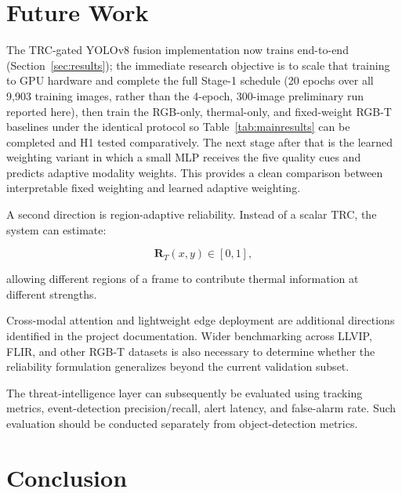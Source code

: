 \documentclass[conference]{IEEEtran}
\begin{document}

\section{Future Work}

The TRC-gated YOLOv8 fusion implementation now trains end-to-end
(Section~\ref{sec:results}); the immediate research objective is to
scale that training to GPU hardware and complete the full Stage-1
schedule (20 epochs over all 9{,}903 training images, rather than the
4-epoch, 300-image preliminary run reported here), then train the
RGB-only, thermal-only, and fixed-weight RGB-T baselines under the
identical protocol so Table~\ref{tab:mainresults} can be completed
and H1 tested comparatively. The next stage after that is the learned
weighting variant in which a small MLP receives the five quality cues
and predicts adaptive modality weights. This provides a clean
comparison between interpretable fixed weighting and learned adaptive
weighting.

A second direction is region-adaptive reliability. Instead of a scalar TRC, the system can estimate:

\begin{equation}
\mathbf{R}_T(x,y)\in[0,1],
\end{equation}

allowing different regions of a frame to contribute thermal information at different strengths.

Cross-modal attention and lightweight edge deployment are additional directions identified in the project documentation. Wider benchmarking across LLVIP, FLIR, and other RGB-T datasets is also necessary to determine whether the reliability formulation generalizes beyond the current validation subset.

The threat-intelligence layer can subsequently be evaluated using tracking metrics, event-detection precision/recall, alert latency, and false-alarm rate. Such evaluation should be conducted separately from object-detection metrics.


\section{Conclusion}
\end{document}

